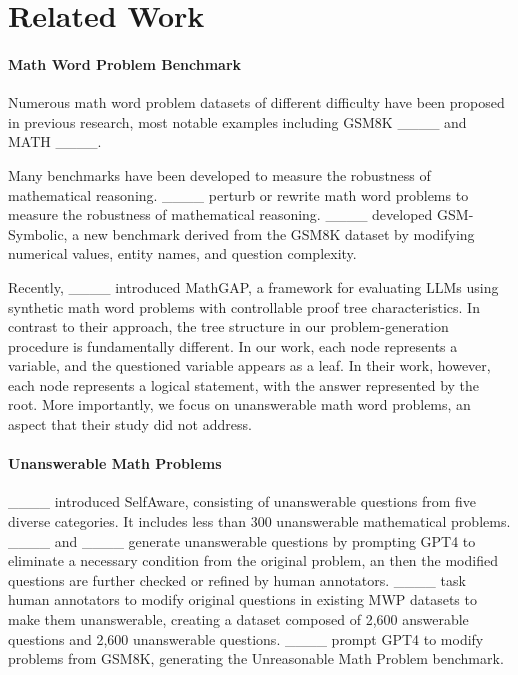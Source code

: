 \section{Related Work}
\paragraph{Math Word Problem Benchmark}
Numerous math word problem datasets of different difficulty have been proposed in previous research, most notable examples including GSM8K ____ and MATH ____.

Many benchmarks have been developed to measure the robustness of mathematical reasoning. ____ perturb or rewrite math word problems to measure the robustness of mathematical reasoning. ____ developed GSM-Symbolic, a new benchmark derived from the GSM8K dataset by modifying numerical values, entity names, and question complexity. 

Recently, ____ introduced MathGAP, a framework for evaluating LLMs using synthetic math word problems
with controllable proof tree characteristics. 
In contrast to their approach, the tree structure in our problem-generation procedure is fundamentally different. In our work, each node represents a variable, and the questioned variable appears as a leaf. In their work, however, each node represents a logical statement, with the answer represented by the root. More importantly, we focus on unanswerable math word problems, an aspect that their study did not address.

\paragraph{Unanswerable Math Problems}

____ introduced SelfAware, consisting
of unanswerable questions from five diverse categories. It includes less than 300 unanswerable mathematical problems. ____ and ____ generate unanswerable questions by prompting GPT4 to eliminate a necessary condition from the original problem, an then the modified questions are further checked or refined by human annotators.
____ task human annotators to modify original questions in existing MWP datasets to make them unanswerable, creating a dataset composed of 2,600 answerable questions and 2,600 unanswerable questions. ____ prompt GPT4 to modify problems from GSM8K, generating the Unreasonable Math Problem benchmark. 

